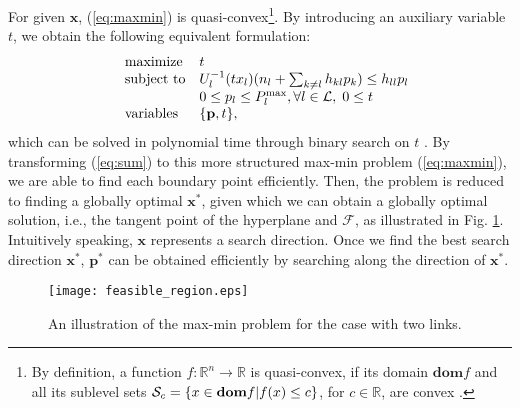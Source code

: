 \documentclass[10pt,journal,letterpaper,compsoc]{IEEEtran}
\begin{document}
For given $\mathbf{x}$, (\ref{eq:maxmin}) is quasi-convex\footnote{By definition, a function $f : \mathbb{R}^n\rightarrow\mathbb{R}$ is quasi-convex, if its domain ${\textbf{dom}}f$ and all its sublevel sets $\mathcal{S}_c=\{x\in \text{\textbf{dom}}f|f(x)\le c\}$, for $c\in \mathbb{R}$, are convex \cite{boyd:2004}.}. By introducing an auxiliary variable $t$, we obtain the following equivalent formulation:
\begin{equation}\begin{array}
[c]{lll}&{\text{maximize} }&t
\\
&\text{subject to}& U_l^{-1}(tx_l)(n_l+\sum_{k\ne l}{h_{kl}p_k})\le h_{ll}p_l
\\
&& 0\leq p_l\leq P_l^{\max}, \forall l\in\mathcal{L}, \;0\le t
\\
& \text{variables}& \{\mathbf{p},t\},
\end{array}
\label{eq:bs}
\end{equation}
which can be solved in polynomial time through binary search on $t$ \cite{boyd:2004}. By transforming (\ref{eq:sum}) to this more structured max-min problem (\ref{eq:maxmin}), we are able to find each boundary point efficiently. Then, the problem is reduced to finding a globally optimal $\mathbf{x}^*$, given which we can obtain a globally optimal solution, i.e., the tangent point of the hyperplane and $\mathcal{F}$, as illustrated in Fig. \ref{fig:fr}. Intuitively speaking, $\mathbf{x}$ represents a search direction. Once we find the best search direction $\mathbf{x}^*$, $\mathbf{p}^*$ can be obtained efficiently by searching along the direction of $\mathbf{x}^*$.

\begin{figure}[t]
\begin{center}
\vspace{0.5cm}\hspace{-0cm} {\texttt{[image: feasible\_region.eps]}}\hspace{-0.0cm}
\vspace{5.5cm} \caption{An illustration of the max-min problem for the case with two links.}\vspace{-0.0cm}
\label{fig:fr}
\end{center}
\end{figure}
\end{document}
